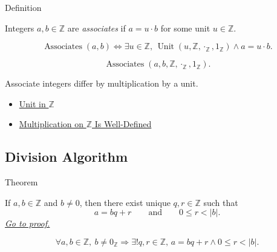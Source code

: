\begin{definitionbox}{Definition}
\begin{definition}
\label{def:associates-in-z}
Integers $a,b\in\mathbb{Z}$ are \emph{associates} if $a=u\cdot b$ for some
unit $u\in\mathbb{Z}$.
\end{definition}
\end{definitionbox}

\begin{remark*}
\[
\operatorname{Associates}(a,b)
\Longleftrightarrow
\exists u\in\mathbb{Z},\,
\operatorname{Unit}(u,\mathbb{Z},\cdot_{\mathbb{Z}},1_{\mathbb{Z}})
\land a=u\cdot b.
\]
\end{remark*}

\begin{remark*}
\[
\operatorname{Associates}(a,b,\mathbb{Z},\cdot_{\mathbb{Z}},1_{\mathbb{Z}}).
\]
\end{remark*}

\begin{remark*}[Interpretation]
Associate integers differ by multiplication by a unit.
\end{remark*}

\begin{dependencies}
\begin{itemize}
  \item \hyperref[def:unit-in-z]{Unit in $\mathbb{Z}$}
  \item \hyperref[thm:multiplication-on-z-well-defined]{Multiplication on $\mathbb{Z}$ Is Well-Defined}
\end{itemize}
\end{dependencies}

\subsection*{Division Algorithm}

\begin{theorembox}{Theorem}
\begin{theorem}
\label{thm:division-algorithm-on-z}
If $a,b\in\mathbb{Z}$ and $b\ne0$, then there exist unique
$q,r\in\mathbb{Z}$ such that
\[
a=bq+r
\qquad\text{and}\qquad
0\le r<|b|.
\]
\hyperref[prf:division-algorithm-on-z]{\textit{Go to proof.}}
\end{theorem}
\end{theorembox}

\begin{remark*}
\[
\forall a,b\in\mathbb{Z},\ b\ne0_{\mathbb{Z}}
\Longrightarrow
\exists! q,r\in\mathbb{Z},\,
a=bq+r\land 0\le r<|b|.
\]
\end{remark*}


